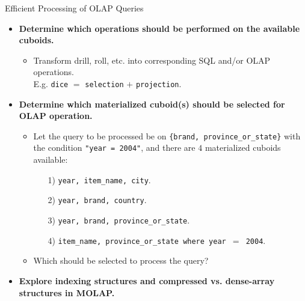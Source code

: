 \begin{frame}{Efficient Processing of OLAP Queries}
  \begin{itemize}
  \item \textbf{Determine which operations should be performed on the available cuboids.}
    \begin{itemize}
    \item Transform drill, roll, etc. into corresponding SQL and/or OLAP operations.\\
      E.g. \texttt{dice} $=$ \texttt{selection} $+$ \texttt{projection}.
    \end{itemize}
  \item \textbf{Determine which materialized cuboid(s) should be selected for OLAP operation.}
    \begin{itemize}
    \item Let the query to be processed be on \texttt{\{brand, province\_or\_state\}} with the condition \texttt{"year = 2004"}, and there are $4$ materialized cuboids available:
      \begin{itemize}
      \item[1)] \texttt{{year, item\_name, city}}.
      \item[2)] \texttt{{year, brand, country}}.
      \item[3)] \texttt{{year, brand, province\_or\_state}}.
      \item[4)] \texttt{{item\_name, province\_or\_state} where year $=$ 2004}.
      \end{itemize}
    \item Which should be selected to process the query?
    \end{itemize}
  \item \textbf{Explore indexing structures and compressed vs. dense-array structures in MOLAP.}
  \end{itemize}
\end{frame}

